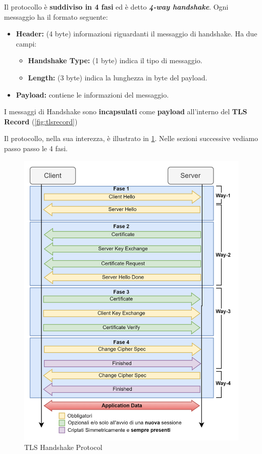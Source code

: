 Il protocollo è \textbf{suddiviso in 4 fasi} ed è detto \textit{\textbf{4-way handshake}}. Ogni messaggio ha il formato seguente:
\begin{definition}\label{def:handshakeform}
\begin{itemize}
    \item \textbf{Header:} (4 byte) informazioni riguardanti il messaggio di handshake. Ha due campi:
    \begin{itemize}
        \item \textbf{Handshake Type:} (1 byte) indica il tipo di messaggio.
        \item \textbf{Length:} (3 byte) indica la lunghezza in byte del payload.
    \end{itemize}
    \item \textbf{Payload:} contiene le informazioni del messaggio.
\end{itemize}
I messaggi di Handshake sono \textbf{incapsulati} come \textbf{payload} all'interno del \textbf{TLS Record} (\cref{fig:tlsrecord})
\end{definition}
Il protocollo, nella sua interezza, è illustrato in \cref{fig:handshakeprot}. Nelle sezioni successive vediamo passo passo le 4 fasi.
\begin{figure}[H]
    \centering
    \includegraphics{image/tlshandshake.png}
    \caption{TLS Handshake Protocol}
    \label{fig:handshakeprot}
\end{figure}
